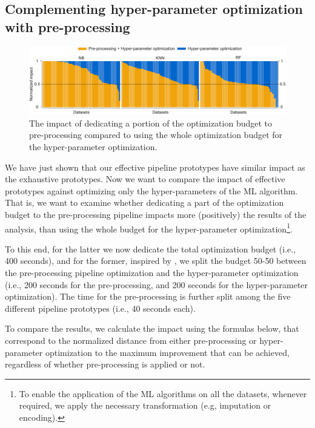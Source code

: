 \subsection{Complementing hyper-parameter optimization with pre-processing}
\label{sec:eval-dpso-vs-cash}

\begin{figure}[!t]
	\centering
	\includegraphics[width=1.0\textwidth]{chapters/data-centric/supervised/img/barplot-10.pdf}
	\caption{The impact of dedicating a portion of the optimization budget to pre-processing compared to using the whole optimization budget for the hyper-parameter optimization.}
	\label{fig:eval-pre-processing-hyper-parameter}
\end{figure}

We have just shown that our effective pipeline prototypes have similar impact as the exhaustive prototypes. Now we want to compare the impact of effective prototypes against optimizing only the hyper-parameters of the ML algorithm. That is, we want to examine whether dedicating a part of the optimization budget to the pre-processing pipeline impacts more (positively) the results of the analysis, than using the whole budget for the hyper-parameter optimization\footnote{To enable the application of the ML algorithms on all the datasets, whenever required, we apply the necessary transformation (e.g, imputation or encoding).}. 

To this end, for the latter we now dedicate the total optimization budget (i.e., 400 seconds), and for the former, inspired by \cite{Quemy20InfSystems}, we split the budget 50-50 between the pre-processing pipeline optimization and the hyper-parameter optimization (i.e., 200 seconds for the pre-processing, and 200 seconds for the hyper-parameter optimization). The time for the pre-processing is further split among the five different pipeline prototypes (i.e., 40 seconds each).

To compare the results, we calculate the impact using the formulas below, that correspond to the normalized distance from either pre-processing or hyper-parameter optimization to the maximum improvement that can be achieved, regardless of whether pre-processing is applied or not. 

